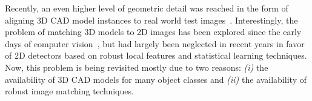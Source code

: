 Recently, an even higher level of geometric detail was reached in the
form of aligning
3D CAD model instances to real world test images~\cite{Aubry14,
  Lim14,Kholgade14, Chen13, Kostas14}. Interestingly, the problem of matching 3D models to 2D
images has been explored since the early days of computer
vision~\cite{Lowe87}, but had largely been neglected in recent years
in favor of 2D detectors based on robust local features and
statistical learning techniques. Now, this problem is being revisited
mostly due to two reasons: {\em (i)} the availability of 3D CAD models
for many object classes and {\em (ii)} the availability of robust
image matching techniques.
%
%
%
%

